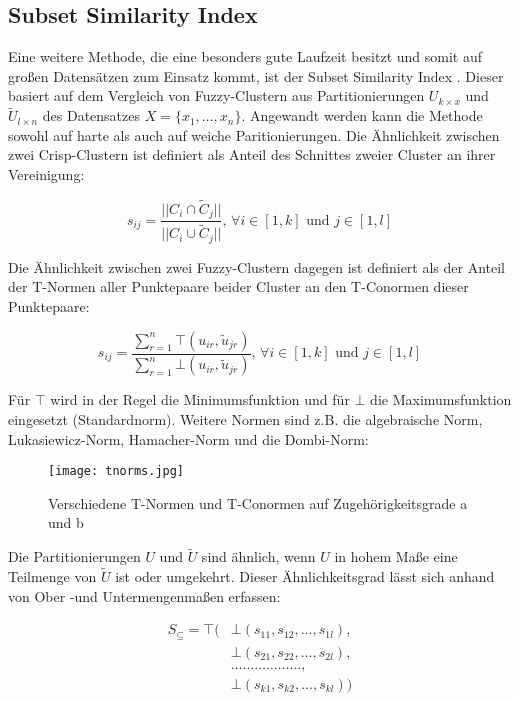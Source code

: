 \documentclass[11pt,ceqn]{book}
\begin{document}
\subsection{Subset Similarity Index}
Eine weitere Methode, die eine besonders gute Laufzeit besitzt und somit auf großen Datensätzen zum Einsatz kommt, ist der Subset Similarity Index \cite{subsim}. Dieser basiert auf dem Vergleich von Fuzzy-Clustern aus Partitionierungen $U_{k\times x}$ und $\tilde{U}_{l\times n}$ des Datensatzes $X=\{x_1,\dots,x_n\}$. Angewandt werden kann die Methode sowohl auf harte als auch auf weiche Paritionierungen. Die Ähnlichkeit zwischen zwei Crisp-Clustern ist definiert als Anteil des Schnittes zweier Cluster an ihrer Vereinigung:

$$s_{ij} = \frac{||C_i \cap \tilde{C}_j||}{||C_i \cup \tilde{C}_j||},  \, \forall i \in \left[1,k\right]\text{ und } j \in \left[1,l\right] $$

Die Ähnlichkeit zwischen zwei Fuzzy-Clustern dagegen ist definiert als der Anteil der T-Normen aller Punktepaare beider Cluster an den T-Conormen dieser Punktepaare:

$$s_{ij} = \frac{\sum\limits_{r=1}^n \top(u_{ir},\tilde{u}_{jr})}{\sum\limits_{r=1}^n \bot (u_{ir},\tilde{u}_{jr})},\, \forall i \in \left[1,k\right]\text{ und } j \in \left[1,l\right]$$

Für $\top$ wird in der Regel die Minimumsfunktion und für $\bot$ die Maximumsfunktion eingesetzt (Standardnorm). Weitere Normen sind z.B. die algebraische Norm, Lukasiewicz-Norm, Hamacher-Norm und die Dombi-Norm:

\begin{figure}[H]
\centering
\texttt{[image: tnorms.jpg]}
\caption{Verschiedene T-Normen und T-Conormen auf Zugehörigkeitsgrade a und b}\label{tnorms}
\end{figure}

Die Partitionierungen $U$ und $\tilde{U}$ sind ähnlich, wenn $U$ in hohem Maße eine Teilmenge von $\tilde{U}$ ist oder umgekehrt. Dieser Ähnlichkeitsgrad lässt sich anhand von Ober -und Untermengenmaßen erfassen:

\begin{align*}
S_{\subseteq} = \top( 
&\bot(s_{11},s_{12}, \dots, s_{1l}), \\
&\bot(s_{21}, s_{22}, \dots, s_{2l}),\\ 
&\dots\dots\dots\dots\dots\dots,\\ 
&\bot(s_{k1}, s_{k2}, \dots, s_{kl})
)
\end{align*}
\end{document}

